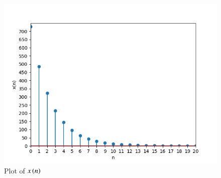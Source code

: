 \documentclass[journal,12pt,twocolumn]{IEEEtran}
\theoremstyle{remark}
\begin{document}
\begin{figure}[!ht]
\centering
\begin{center}
\includegraphics[width=\columnwidth]{Figure_2}
\caption{Plot of $x\left(n\right)$}
\end{center}
\end{figure}
\end{document}

